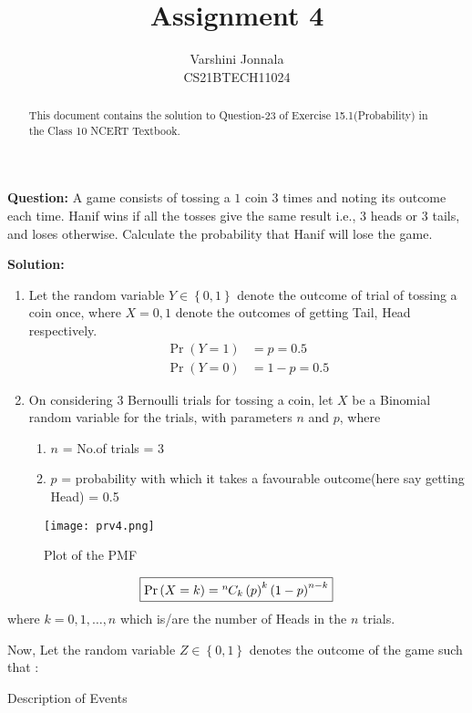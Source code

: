 \documentclass[journal,12pt,twocolumn]{IEEEtran}
\title{Assignment 4}
\author{Varshini Jonnala\\CS21BTECH11024}
\providecommand{\pr}[1]{\ensuremath{\Pr\left(#1\right)}}
\providecommand{\brak}[1]{\ensuremath{\left(#1\right)}}
\providecommand{\cbrak}[1]{\ensuremath{\left\{#1\right\}}}
\newcommand*{\permcomb}[4][0mu]{{{}^{#3}\mkern#1#2_{#4}}}
\newcommand*{\comb}[1][-1mu]{\permcomb[#1]{C}}
\newcommand{\solution}{\noindent \textbf{Solution: }}
\begin{document}
    \maketitle
    \begin{abstract}
    This document contains the solution to Question-23 of Exercise 15.1(Probability) in the Class 10 NCERT Textbook.  
    \end{abstract}
    
    \noindent \textbf{Question: } A game consists of tossing a \rupee$1$ coin $3$ times and noting its outcome each time. Hanif wins if all the tosses give the same result i.e., $3$ heads or $3$ tails, and loses otherwise. Calculate the probability that Hanif will lose the game.
    
    \solution
    
    \begin{enumerate}
         \item Let the random variable $Y\in \cbrak{0,1}$  denote the outcome of trial of tossing a coin once, where $X = 0,1$ denote the outcomes of getting Tail, Head respectively.
	\begin{align}
		\pr{Y=1} &= p = 0.5\\
		\pr{Y=0} &= 1-p = 0.5
	\end{align}
        \item On considering $3$ Bernoulli trials for tossing a coin, let $X$ be a Binomial random variable for the trials, with parameters $n$ and $p$, where
    \begin{enumerate}
		\item $n$ = No.of trials = 3
		\item $p$ = probability with which it takes a favourable outcome(here say getting Head) = 0.5
	\end{enumerate}
	\end{enumerate}
	\begin{figure}[!ht]
	\centering
    \texttt{[image: prv4.png]}
    \caption{Plot of the PMF}
    \label{fig:fig-1}
    \end{figure}

	\begin{align}
	   \fbox{$\pr{X = k} = \comb{n}{k}\brak{p}^k\brak{1-p}^{n-k}$} \label{3}
	\end{align}
	where $k= 0,1,\dots, n$ which is/are the number of Heads in the $n$ trials.
    	
   Now, Let the random variable $Z \in \cbrak{0,1}$ denotes the outcome of the game such that : 
    \begin{table}[ht!]
        \centering
        
    	\caption{Description of Events}
    	\label{Tables:Table}
    \end{table}
    
\end{document}

